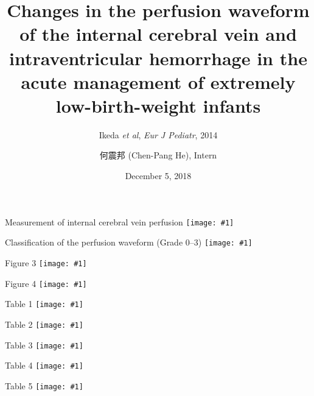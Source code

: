 \documentclass{beamer}
\title[(Ikeda \textit{et al}, 2018)]{
    Changes in the perfusion waveform of the internal cerebral vein and
    intraventricular hemorrhage in the acute management of extremely
    low-birth-weight infants
}
\subtitle{Ikeda \textit{et al}, \textit{Eur J Pediatr}, 2014}
\author[Chen-Pang He]{何震邦 (Chen-Pang He), Intern}
\date{December 5, 2018}
\institute[CGH]{Cathay General Hospital}
\newcommand*{\solo}[1]{\centering\texttt{[image: \#1]}}
\begin{document}
\maketitle

\begin{frame}{Measurement of internal cerebral vein perfusion}
    \solo{F1.png}
\end{frame}

\begin{frame}{Classification of the perfusion waveform (Grade 0--3)}
    \solo{F2.png}
\end{frame}

\begin{frame}{Figure 3}
    \solo{F3.png}
\end{frame}

\begin{frame}{Figure 4}
    \solo{F4.png}
\end{frame}

\begin{frame}{Table 1}
    \solo{T1.eps}
\end{frame}

\begin{frame}{Table 2}
    \solo{T2.eps}
\end{frame}

\begin{frame}{Table 3}
    \solo{T3.eps}
\end{frame}

\begin{frame}{Table 4}
    \solo{T4.eps}
\end{frame}

\begin{frame}{Table 5}
    \solo{T5.eps}
\end{frame}
\end{document}
